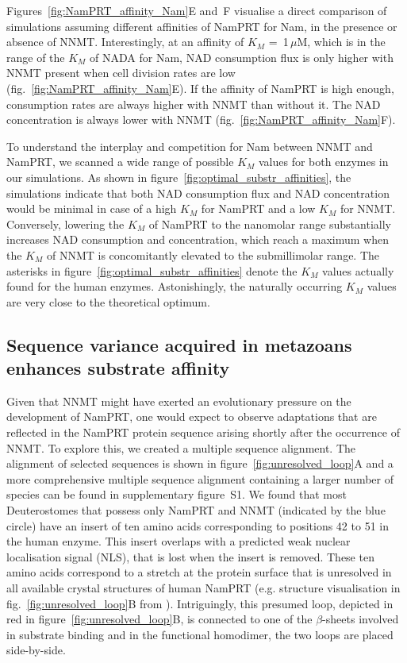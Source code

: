 Figures~\ref{fig:NamPRT_affinity_Nam}E and~F visualise a direct comparison of simulations assuming different affinities of NamPRT for Nam, in the presence or absence of NNMT. Interestingly, at an affinity of $K_{M}$ =~1\,$\mu$M, which is in the range of the $K_{M}$ of NADA for Nam, NAD consumption flux is only higher with NNMT present when cell division rates are low (fig.~\ref{fig:NamPRT_affinity_Nam}E). If the affinity of NamPRT is high enough, consumption rates are always higher with NNMT than without it. The NAD concentration is always lower with NNMT (fig.~\ref{fig:NamPRT_affinity_Nam}F).

To understand the interplay and competition for Nam between NNMT and NamPRT, we scanned a wide range of possible $K_{M}$ values for both enzymes in our simulations. As shown in figure~\ref{fig:optimal_substr_affinities}, the simulations indicate that both NAD consumption flux and NAD concentration would be minimal in case of a high $K_{M}$ for NamPRT and a low $K_{M}$ for NNMT. Conversely, lowering the $K_{M}$ of NamPRT to the nanomolar range substantially increases NAD consumption and concentration, which reach a maximum when the $K_{M}$ of NNMT is concomitantly elevated to the submillimolar range. The asterisks in figure~\ref{fig:optimal_substr_affinities} denote the $K_{M}$ values actually found for the human enzymes. Astonishingly, the naturally occurring $K_{M}$ values are very close to the theoretical optimum.


\subsection{Sequence variance acquired in metazoans enhances substrate affinity}

Given that NNMT might have exerted an evolutionary pressure on the development of NamPRT, one would expect to observe adaptations that are reflected in the NamPRT protein sequence arising shortly after the occurrence of NNMT. To explore this, we created a multiple sequence alignment. The alignment of selected sequences is shown in figure~\ref{fig:unresolved_loop}A and a more comprehensive multiple sequence alignment containing a larger number of species can be found in supplementary figure~S1. We found that most Deuterostomes that possess only NamPRT and NNMT (indicated by the blue circle) have an insert of ten amino acids corresponding to positions 42 to 51 in the human enzyme. This insert overlaps with a predicted weak nuclear localisation signal (NLS), that is lost when the insert is removed. These ten amino acids correspond to a stretch at the protein surface that is unresolved in all available crystal structures of human NamPRT (e.g. structure visualisation in fig.~\ref{fig:unresolved_loop}B from \citet{Wang2006}). Intriguingly, this presumed loop, depicted in red in figure~\ref{fig:unresolved_loop}B, is connected to one of the $\beta$-sheets involved in substrate binding \citep{Burgos2009} and in the functional homodimer, the two loops are placed side-by-side.

